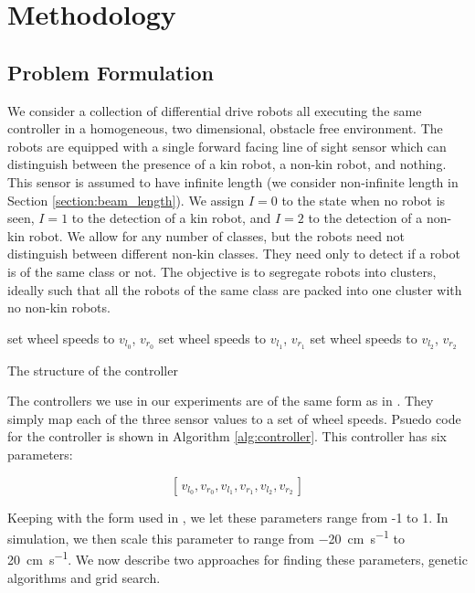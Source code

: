 \documentclass[conference]{IEEEtran}
\begin{document}
\section{Methodology}

  \subsection{Problem Formulation}

    We consider a collection of differential drive robots all executing the same controller in a homogeneous, two dimensional, obstacle free environment. The robots are equipped with a single forward facing line of sight sensor which can distinguish between the presence of a kin robot, a non-kin robot, and nothing. This sensor is assumed to have infinite length (we consider non-infinite length in Section \ref{section:beam_length}). We assign $I=0$ to the state when no robot is seen, $I=1$ to the detection of a kin robot, and $I=2$ to the detection of a non-kin robot. We allow for any number of classes, but the robots need not distinguish between different non-kin classes. They need only to detect if a robot is of the same class or not. The objective is to segregate robots into clusters, ideally such that all the robots of the same class are packed into one cluster with no non-kin robots.

    \begin{algorithm}[t!]
      \begin{algorithmic}
       \State set wheel speeds to $v_{l_0}$, $v_{r_0}$
       \State set wheel speeds to $v_{l_1}$, $v_{r_1}$
      \Else \State set wheel speeds to $v_{l_2}$, $v_{r_2}$
      \EndIf
      \end{algorithmic}
      \caption{The structure of the controller}
      \label{alg:controller}
    \end{algorithm}

    The controllers we use in our experiments are of the same form as in \cite{gauci_self-organized_2014}. They simply map each of the three sensor values to a set of wheel speeds. Psuedo code for the controller is shown in Algorithm \ref{alg:controller}. This controller has six parameters:

    $$[\,v_{l_0}, v_{r_0}, v_{l_1}, v_{r_1}, v_{l_2}, v_{r_2}\,]$$

    Keeping with the form used in \cite{gauci_self-organized_2014}, we let these parameters range from -1 to 1. In simulation, we then scale this parameter to range from \SI{-20}{\centi\meter\per\second} to \SI{20}{\centi\meter\per\second}. We now describe two approaches for finding these parameters, genetic algorithms and grid search.
\end{document}
